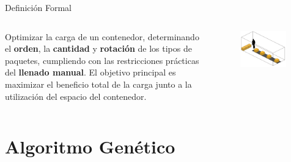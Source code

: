 \documentclass[handout]{beamer}
\begin{document}
\begin{frame}{Definición Formal}
    \begin{columns}
        \begin{column}{0.7\textwidth}
            \begin{center}
                Optimizar la carga de un contenedor, determinando el \textbf{\textcolor{ritsumeikan}{orden}}, la \textbf{\textcolor{ritsumeikan}{cantidad}} y  \textbf{\textcolor{ritsumeikan}{rotación}} de los tipos de paquetes, cumpliendo con las restricciones prácticas del \textbf{\textcolor{ritsumeikan}{llenado manual}}. El objetivo principal es maximizar el beneficio total de la carga junto a la utilización del espacio del contenedor.
            \end{center}
        \end{column}
        \begin{column}{0.4\textwidth}
            \begin{figure}
                \centering
                \includegraphics[width=0.95\textwidth]{pic/cinta-transportadora.png}
                \label{fig:cinta-transportadora}
            \end{figure}
        \end{column}
    \end{columns}

\end{frame}

\section{Algoritmo Genético}
\end{document}
